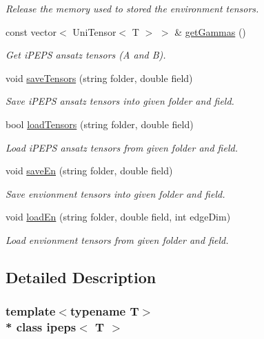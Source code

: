 \begin{DoxyCompactItemize}
\begin{DoxyCompactList}\small\item\em Release the memory used to stored the environment tensors. \end{DoxyCompactList}\item 
const vector$<$ Uni\+Tensor$<$ T $>$ $>$ \& \hyperlink{classipeps_ae91a100e1aab3454e3f750907f206765}{get\+Gammas} ()
\begin{DoxyCompactList}\small\item\em Get i\+P\+E\+PS ansatz tensors (A and B). \end{DoxyCompactList}\item 
void \hyperlink{classipeps_aab130d93c192c45e929182d62a5e7ec1}{save\+Tensors} (string folder, double field)
\begin{DoxyCompactList}\small\item\em Save i\+P\+E\+PS ansatz tensors into given folder and field. \end{DoxyCompactList}\item 
bool \hyperlink{classipeps_a026eacb53da1aa9f46568fa9e1bb78cb}{load\+Tensors} (string folder, double field)
\begin{DoxyCompactList}\small\item\em Load i\+P\+E\+PS ansatz tensors from given folder and field. \end{DoxyCompactList}\item 
void \hyperlink{classipeps_a6b597b40f82d23b3dc6277b2e863882b}{save\+En} (string folder, double field)
\begin{DoxyCompactList}\small\item\em Save envionment tensors into given folder and field. \end{DoxyCompactList}\item 
void \hyperlink{classipeps_addde49fef43d20baed94caaa1bc66555}{load\+En} (string folder, double field, int edge\+Dim)
\begin{DoxyCompactList}\small\item\em Load envionment tensors from given folder and field. \end{DoxyCompactList}\end{DoxyCompactItemize}


\subsection{Detailed Description}
\subsubsection*{template$<$typename T$>$\\*
class ipeps$<$ T $>$}

